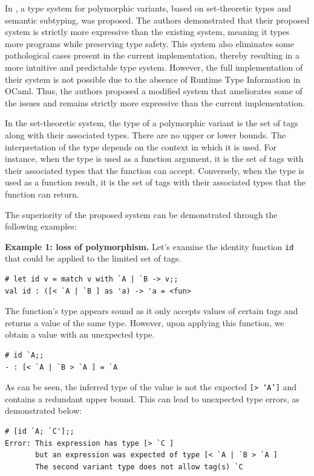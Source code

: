 \documentclass[a4paper,11pt,oneside]{article}
\theoremstyle{definition}
\begin{document}
In \cite{Castagna_2016}, a type system for polymorphic variants, based on set-theoretic types and semantic subtyping, was proposed. The authors demonstrated that their proposed system is strictly more expressive than the existing system, meaning it types more programs while preserving type safety. This system also eliminates some pathological cases present in the current implementation, thereby resulting in a more intuitive and predictable type system. However, the full implementation of their system is not possible due to the absence of Runtime Type Information in OCaml. Thus, the authors proposed a modified system that ameliorates some of the issues and remains strictly more expressive than the current implementation.

In the set-theoretic system, the type of a polymorphic variant is the set of tags along with their associated types. There are no upper or lower bounds. The interpretation of the type depends on the context in which it is used. For instance, when the type is used as a function argument, it is the set of tags with their associated types that the function can accept. Conversely, when the type is used as a function result, it is the set of tags with their associated types that the function can return.

The superiority of the proposed system can be demonstrated through the following examples:

\textbf{Example 1: loss of polymorphism.} Let's examine the identity function \texttt{id} that could be applied to the limited set of tags.

  {\ttfamily\begin{verbatim}
# let id v = match v with `A | `B -> v;;
val id : ([< `A | `B ] as 'a) -> 'a = <fun>
\end{verbatim}}

The function's type appears sound as it only accepts values of certain tags and returns a value of the same type. However, upon applying this function, we obtain a value with an unexpected type.

  {\ttfamily\begin{verbatim}
# id `A;;
- : [< `A | `B > `A ] = `A
\end{verbatim}}

As can be seen, the inferred type of the value is not the expected \texttt{[> `A']} and contains a redundant upper bound. This can lead to unexpected type errors, as demonstrated below:

{\ttfamily\begin{verbatim}
# [id `A; `C'];;
Error: This expression has type [> `C ]
       but an expression was expected of type [< `A | `B > `A ]
       The second variant type does not allow tag(s) `C
\end{verbatim}}
\end{document}

